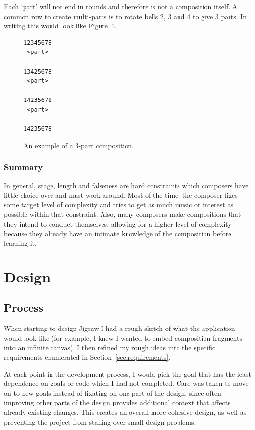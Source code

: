 \documentclass[12pt]{article}
\begin{document}
Each `part' will not end in rounds and therefore is not a composition itself.  A common row to
create multi-parts is to rotate bells 2, 3 and 4 to give 3 parts.  In writing this would look like
Figure~\ref{fig:multi-part}.

\begin{figure}
    \centering
    \begin{BVerbatim}
12345678
 <part>
--------
13425678
 <part>
--------
14235678
 <part>
--------
14235678
    \end{BVerbatim}
    \caption{An example of a 3-part composition.}\label{fig:multi-part}
\end{figure}

\subsubsection{Summary}

In general, stage, length and falseness are hard constraints which composers have little choice over
and must work around.  Most of the time, the composer fixes some target level of complexity and
tries to get as much music or interest as possible within that constraint.  Also, many composers
make compositions that they intend to conduct themselves, allowing for a higher level of complexity
because they already have an intimate knowledge of the composition before learning it.



\pagebreak

\section{Design}

\subsection{Process}

When starting to design Jigsaw I had a rough sketch of what the application would look like (for
example, I knew I wanted to embed composition fragments into an infinite canvas).  I then refined my
rough ideas into the specific requirements enumerated in Section~\ref{sec:requirements}.

At each point in the development process, I would pick the goal that has the least dependence on
goals or code which I had not completed.  Care was taken to move on to new goals instead of fixating
on one part of the design, since often improving other parts of the design provides additional
context that affects already existing changes.  This creates an overall more cohesive design, as
well as preventing the project from stalling over small design problems.
\end{document}
